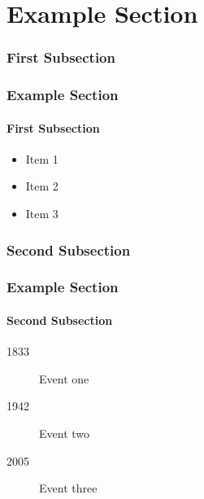 \section{Example Section}
\subsubsection{First Subsection}
\begin{frame}
    \frametitle{Example Section}
    \framesubtitle{First Subsection}

    \begin{itemize}
        \item Item 1
        \item Item 2
        \item Item 3
    \end{itemize}
\end{frame}

\subsubsection{Second Subsection}
\begin{frame}
    \frametitle{Example Section}
    \framesubtitle{Second Subsection}

    \begin{description}
        \item[1833] Event one
        \item[1942] Event two
        \item[2005] Event three
    \end{description}
\end{frame}
